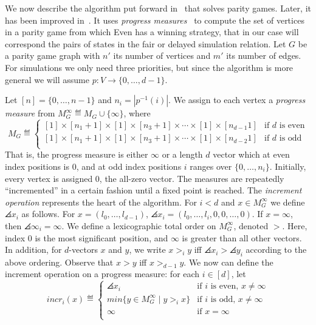 We now describe the algorithm put forward in~\cite{jurdzinski2000small} that
solves parity games.
Later, it has been improved in~\cite{etessami2005fair}.
It uses \emph{progress measures}~\cite{klarlund1994progress,walukiewicz2000completeness}
to compute the set of vertices in a parity game from which Even has a winning strategy,
that in our case will correspond the pairs of states in the fair or delayed simulation
relation.
Let $G$ be a parity game graph with $n'$ its number of vertices and $m'$ its
number of edges.
For simulations we only need three priorities, but since the algorithm is more
general we will assume $p: V \rightarrow \{0, \dots, d-1\}$.

Let $[n] = \{0, \dots, n-1\}$ and $n_i = |p^{-1}(i)|$. We assign to each vertex a
\emph{progress measure} from $M^{\infty}_G \eqdef M_G \cup \{\infty\}$, where
\[ M_G \eqdef
\begin{cases}
[1] \times [n_1 + 1] \times [1] \times [n_3 + 1] \times \cdots \times [1] \times [n_{d-1}  1] &\mbox{if $d$ is even}\\
[1] \times [n_1 + 1] \times [1] \times [n_3 + 1] \times \cdots \times [1] \times [n_{d-2}  1] &\mbox{if $d$ is odd}\\
\end{cases} \]
That is, the progress measure is either $\infty$ or a length $d$ vector which
at even index positions is $0$, and at odd index positions $i$ ranges over $\{0, \dots, n_i\}$.
Initially, every vertex is assigned 0, the all-zero vector.
The measures are repeatedly ``incremented'' in a certain fashion until a fixed point is reached.
The \emph{increment operation} represents the heart of the algorithm.
For $i < d$ and $x \in M_G^{\infty}$ we define $\angles{x}_i$ as follows.
For $x = (l_0, \dots, l_{d-1})$, $\angles{x}_i = (l_0, \dots, l_i,0,0, \dots, 0)$.
If $x = \infty$, then $\angles{\infty}_i = \infty$.
We define a lexicographic total order on $M_G^{\infty}$, denoted $>$.
Here, index $0$ is the most significant position, and $\infty$ is greater than all other vectors.
In addition, for $d$-vectors $x$ and $y$, we write $x >_i y$ iff $\angles{x}_i > \angles{y}_i$
according to the above ordering.
Observe that $x > y$ iff $x >_{d-1} y$.
We now can define the increment operation on a progress measure:
for each $i \in [d]$, let
\[ incr_i(x) \eqdef
\begin{cases}
\angles{x}_i &\mbox{if $i$ is even, } x \neq \infty \\
min \{y \in M_G^{\infty} \;|\; y >_i x\}   &\mbox{if $i$ is odd, } x \neq \infty \\
\infty   &\mbox{if } x = \infty \\
\end{cases} \]
